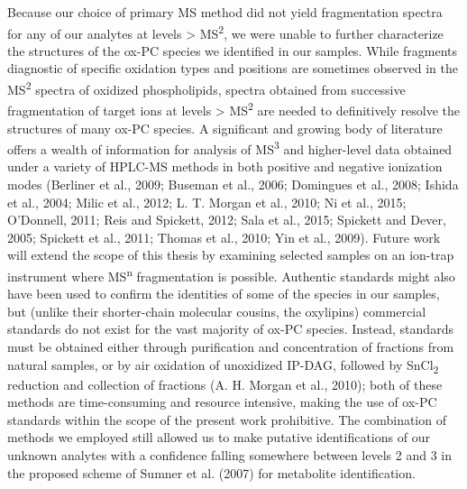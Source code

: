 Because our choice of primary MS method did not yield fragmentation spectra for any of our analytes at levels \textgreater{} MS\textsuperscript{2}, we were unable to further characterize the structures of the ox-PC species we identified in our samples. While fragments diagnostic of specific oxidation types and positions are sometimes observed in the MS\textsuperscript{2} spectra of oxidized phospholipids, spectra obtained from successive fragmentation of target ions at levels \textgreater{} MS\textsuperscript{2} are needed to definitively resolve the structures of many ox-PC species. A significant and growing body of literature offers a wealth of information for analysis of MS\textsuperscript{3} and higher-level data obtained under a variety of HPLC-MS methods in both positive and negative ionization modes (Berliner et al., 2009; Buseman et al., 2006; Domingues et al., 2008; Ishida et al., 2004; Milic et al., 2012; L. T. Morgan et al., 2010; Ni et al., 2015; O'Donnell, 2011; Reis and Spickett, 2012; Sala et al., 2015; Spickett and Dever, 2005; Spickett et al., 2011; Thomas et al., 2010; Yin et al., 2009). Future work will extend the scope of this thesis by examining selected samples on an ion-trap instrument where MS\textsuperscript{n} fragmentation is possible. Authentic standards might also have been used to confirm the identities of some of the species in our samples, but (unlike their shorter-chain molecular cousins, the oxylipins) commercial standards do not exist for the vast majority of ox-PC species. Instead, standards must be obtained either through purification and concentration of fractions from natural samples, or by air oxidation of unoxidized IP-DAG, followed by SnCl\textsubscript{2} reduction and collection of fractions (A. H. Morgan et al., 2010); both of these methods are time-consuming and resource intensive, making the use of ox-PC standards within the scope of the present work prohibitive. The combination of methods we employed still allowed us to make putative identifications of our unknown analytes with a confidence falling somewhere between levels 2 and 3 in the proposed scheme of Sumner et al. (2007) for metabolite identification.

